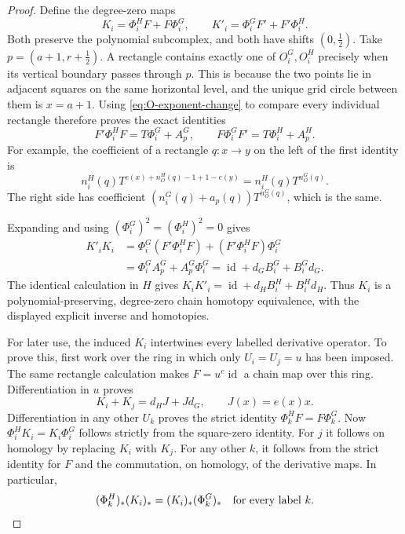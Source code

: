 \documentclass[11pt,a4paper]{article}
\theoremstyle{remark}
\begin{document}
\begin{proof}
Define the degree-zero maps
\[
 K_i=\Phi_i^HF+F\Phi_i^G,\qquad
 K'_i=\Phi_i^GF'+F'\Phi_i^H.
\]
Both preserve the polynomial subcomplex, and both have shifts
$(0,\tfrac12)$.  Take $p=(a+1,r+\tfrac12)$.  A rectangle contains exactly
one of $O_i^G,O_i^H$ precisely when its vertical boundary passes through
$p$.  This is because the two points lie in adjacent squares on the same
horizontal level, and the unique grid circle between them is $x=a+1$.
Using \eqref{eq:O-exponent-change} to compare every individual rectangle
therefore proves the exact identities
\begin{equation}\label{eq:conjugated-derivative}
 F'\Phi_i^HF=T\Phi_i^G+A_p^G,
 \qquad F\Phi_i^GF'=T\Phi_i^H+A_p^H.
\end{equation}
For example, the coefficient of a rectangle $q:x\to y$ on the left of
the first identity is
\[
 n_i^H(q)T^{e(x)+n_O^H(q)-1+1-e(y)}
 =n_i^H(q)T^{n_O^G(q)}.
\]
The right side has coefficient
$(n_i^G(q)+a_p(q))T^{n_O^G(q)}$, which is the same.

Expanding and using $(\Phi_i^G)^2=(\Phi_i^H)^2=0$ gives
\[
 \begin{split}
 K'_iK_i
 &=\Phi_i^G(F'\Phi_i^HF)+(F'\Phi_i^HF)\Phi_i^G\\
 &=\Phi_i^GA_p^G+A_p^G\Phi_i^G
 =\operatorname{id}+d_GB_i^G+B_i^Gd_G.
 \end{split}
\]
The identical calculation in $H$ gives
$K_iK'_i=\operatorname{id}+d_HB_i^H+B_i^Hd_H$.
Thus $K_i$ is a polynomial-preserving, degree-zero chain homotopy
equivalence, with the displayed explicit inverse and homotopies.

For later use, the induced $K_i$ intertwines every labelled derivative
operator.  To prove this, first work over the ring in which only
$U_i=U_j=u$ has been imposed.  The same rectangle calculation makes
$F=u^e\operatorname{id}$ a chain map over this ring.  Differentiation in
$u$ proves
\[
 K_i+K_j=d_HJ+Jd_G,\qquad J(x)=e(x)x.
\]
Differentiation in any other $U_k$ proves the strict identity
$\Phi_k^HF=F\Phi_k^G$.  Now $\Phi_i^HK_i=K_i\Phi_i^G$ follows strictly
from the square-zero identity.  For $j$ it follows on homology by
replacing $K_i$ with $K_j$.  For any other $k$, it follows from the strict
identity for $F$ and the commutation, on homology, of the derivative maps.
In particular,
\begin{equation}\label{eq:K-derivative-naturality}
 (\Phi_k^H)_*(K_i)_*=(K_i)_*(\Phi_k^G)_*
 \quad\hbox{for every label }k.
\end{equation}


\end{proof}
\end{document}
